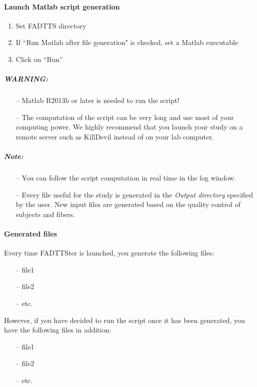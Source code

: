 \documentclass[fadttsterUserGuide_use]{subfiles}
\begin{document}
	\paragraph{Launch Matlab script generation}
	\begin{enumerate}
		\item Set FADTTS directory		
		\item If ``Run Matlab after file generation" is checked, set a Matlab executable
		\item Click on ``Run''
	\end{enumerate}
	\subparagraph{\textbf{WARNING:}}
	\begin{itemize}
		\item[--] Matlab R2013b or later is needed to run the script!
		\item[--] The computation of the script can be very long and use most of your computing power. We highly recommend that you launch your study on a remote server such as KillDevil instead of on your lab computer.
	\end{itemize}
	\subparagraph{\textbf{Note:}}
	\begin{itemize}
		\item[--] You can follow the script computation in real time in the log window.
		\item[--] Every file useful for the study is generated in the \textit{Output directory} specified by the user. New input files are generated based on the quality control of subjects and fibers.
	\end{itemize}
	\vfill
	\newpage
	
	\paragraph{Generated files}
	Every time FADTTSter is launched, you generate the following files:
	\begin{itemize}
		\item[--] file1
		\item[--] file2
		\item[--] etc.
	\end{itemize}	
	However, if you have decided to run the script once it has been generated, you have the following files in addition:
	\begin{itemize}
		\item[--] file1
		\item[--] file2
		\item[--] etc.
	\end{itemize}
\end{document}
